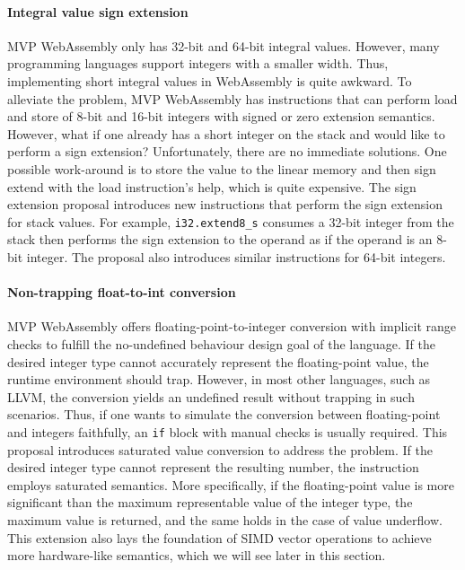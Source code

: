 \paragraph{Integral value sign extension}
MVP WebAssembly only has 32-bit and 64-bit integral values. However, many
programming languages support integers with a smaller width. Thus, implementing
short integral values in WebAssembly is quite awkward. To alleviate the problem,
MVP WebAssembly has instructions that can perform load and store of 8-bit and
16-bit integers with signed or zero extension semantics. However, what if one
already has a short integer on the stack and would like to perform a sign
extension?  Unfortunately, there are no immediate solutions. One possible
work-around is to store the value to the linear memory and then sign extend with
the load instruction's help, which is quite expensive. The sign extension
proposal introduces new instructions that perform the sign extension for stack
values. For example, \texttt{i32.extend8\_s} consumes a 32-bit integer from the
stack then performs the sign extension to the operand as if the operand is an
8-bit integer. The proposal also introduces similar instructions for 64-bit
integers.

\paragraph{Non-trapping float-to-int conversion}
MVP WebAssembly offers floating-point-to-integer conversion with implicit range
checks to fulfill the no-undefined behaviour design goal of the language. If the
desired integer type cannot accurately represent the floating-point value, the
runtime environment should trap. However, in most other languages, such as LLVM,
the conversion yields an undefined result without trapping in such scenarios.
Thus, if one wants to simulate the conversion between floating-point and
integers faithfully, an \texttt{if} block with manual checks is usually
required. This proposal introduces saturated value conversion to address the
problem. If the desired integer type cannot represent the resulting number, the
instruction employs saturated semantics. More specifically, if the
floating-point value is more significant than the maximum representable value
of the integer type, the maximum value is returned, and the same holds in the
case of value underflow. This extension also lays the foundation of SIMD vector
operations to achieve more hardware-like semantics, which we will see later in
this section.

